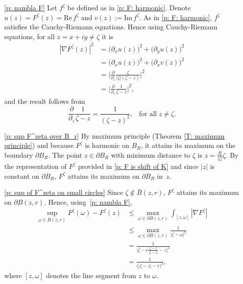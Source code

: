 \documentclass[11pt]{article}
\makeatletter
\renewenvironment{proof}[1][\proofname]{
   \par\pushQED{\qed}\normalfont
   \topsep6\p@\@plus6\p@\relax
   \trivlist\item[\hskip\labelsep\bfseries#1\@addpunct{.}]
   \ignorespaces
}{
   \popQED\endtrivlist\@endpefalse
}
\numberwithin{equation}{section}
\makeatother
\begin{document}
\begin{proof}
\begin{itemize}
  \item[\ref{p: nambla F}]   
    Let $f^{\zeta}$ be defined as in \ref{p: F: harmonic}.
    Denote $u(z) = F^{\zeta}(z) = \text{Re}\, f^{\zeta}$ 
    and \hbox{$v(z) := \text{Im}\, f^{\zeta}$.}
    As in \ref{p: F: harmonic}, 
    $f^{\zeta}$ satisfies the Cauchy-Riemann equations. 
    Hence using Cauchy-Riemann equations, for all $z = x+iy \neq \zeta$ it is 
    \begin{equation}\nonumber
      \begin{split}
          | \nabla F^{\zeta} (z) |^2 
        & = \big( \partial_x u(z) \big) ^2 + \big( \partial_y u(z) \big) ^2 \\
        & = \big( \partial_x u(z) \big) ^2 + \big( \partial_x v(z) \big) ^2 \\
        & = \bigg| \frac{\partial}{\partial_z} 
          \frac{\zeta}{|\zeta| (\zeta -z)} \bigg|^2 \\
        &= \bigg| \frac{\partial}{\partial_z} 
        \frac{1}{\zeta -z}\bigg|^2,
      \end{split}
    \end{equation}
    and the result follows from
    \begin{equation}\nonumber
      \frac{\partial}{\partial_z} 
        \frac{1}{\zeta -z} = \frac{1}{(\zeta - z)^2},
        \;\;\; \text{for all} \; z \neq \zeta. 
    \end{equation} 

  \item[\ref{p: sup F^zeta over B_r}] 
    By maximum principle (Theorem \ref{T: maximum principle})
    and because $F^{\zeta}$ is harmonic on $B_R$,  
    it attains its maximum on the boundary $\partial B_R$. 
    The point $z \in \partial B_R$ with minimum distance to $\zeta$  
    is $z = \frac{R}{|\zeta|} \zeta$.
    By the representation of $F^{\zeta}$ provided in
    \ref{p: F is shift of K} and since $|z|$ is constant on $\partial B_R$, 
    $F^{\zeta}$ attains its maximum on $\partial B_R$ \hbox{in $z$}.
    
  \item[\ref{p: sup of F^zeta on small circles}] 
    Since $\zeta \notin \bar{B}(z,r)$, 
    $F^{\zeta}$ attains its maximum on $\partial B(z,r)$.   
    Hence, \hbox{using \ref{p: nambla F},}
    \begin{equation}\nonumber
    \begin{split}
      \sup_{\omega \in B(z,r)}  
        F^{\zeta}(\omega) - F^{\zeta}(z)  
      &\leq \max_{\omega \in \partial B(z,r)} 
        \int_{[z,\omega]} |\nabla F^{\zeta}| \\
      &\leq \max_{\omega \in \partial B(z,r)} 
        \frac{1}{|\zeta - \omega|^2}\\
      &= \frac{1}{\big|
      \zeta - r \frac{\zeta-z}{|\zeta-z|} -z \big|^2}\\
      &= \frac{1}{\big( |\zeta - z| -r\big)^2},
    \end{split}
    \end{equation}
    where $[z, \omega]$ denotes the line segment from 
    $z$ to $\omega$. 
  \end{itemize}
\end{proof}
\end{document}
